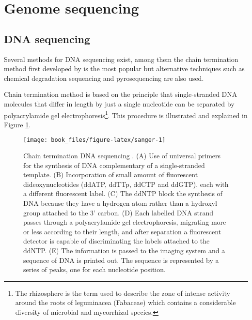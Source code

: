 \documentclass[]{book}
\let\rmarkdownfootnote\footnote%
\def\footnote{\protect\rmarkdownfootnote}
\begin{document}
\hypertarget{genome-sequencing}{%
\section{Genome sequencing}\label{genome-sequencing}}

\hypertarget{DNAseq}{%
\subsection{DNA sequencing}\label{DNAseq}}

Several methods for DNA sequencing exist, among them the chain
termination method first developed by \citep{sanger1977dna} is the most
popular but alternative techniques such as chemical degradation
sequencing \citep{maxam1977new} and pyrosequencing \citep{nyren1993solid} are also
used.

Chain termination method is based on the principle that single-stranded
DNA molecules that differ in length by just a single nucleotide can be
separated by polyacrylamide gel electrophoresis\footnote{The rhizosphere is the term used to describe the zone of intense
  activity around the roots of leguminacea (Fabaceae) which contains a
  considerable diversity of microbial and mycorrhizal species.}. This procedure is
illustrated and explained in Figure \ref{fig:sanger}.



\begin{figure}

{\centering \texttt{[image: book\_files/figure-latex/sanger-1]} 

}

\caption{Chain termination DNA sequencing \citep{brown2007genomes}. (A) Use of universal primers for the synthesis of DNA complementary of a single-stranded template. (B) Incorporation of small amount of fluorescent dideoxynucleotides (ddATP, ddTTp, ddCTP and ddGTP), each with a different fluorescent label. (C) The ddNTP block the synthesis of DNA because they have a hydrogen atom rather than a hydroxyl group attached to the 3' carbon. (D) Each labelled DNA strand passes through a polyacrylamide gel electrophoresis, migrating more or less according to their length, and after separation a fluorescent detector is capable of discriminating the labels attached to the ddNTP. (E) The information is passed to the imaging system and a sequence of DNA is printed out. The sequence is represented by a series of peaks, one for each nucleotide position.}\label{fig:sanger}
\end{figure}
\end{document}
